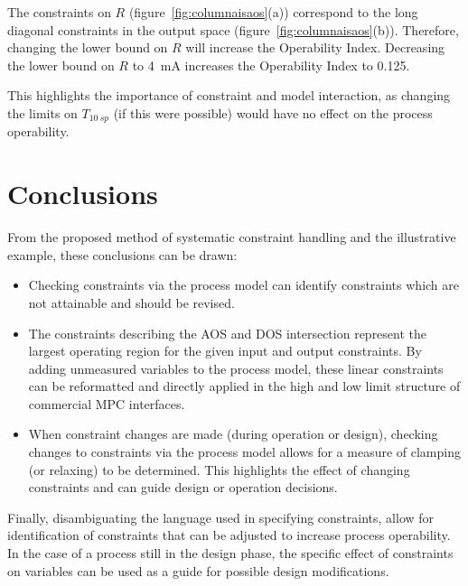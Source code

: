 \documentclass[final,authoryear,5pt,times,twocolumn]{elsarticle}
\begin{document}
The constraints on $R$ (figure~\ref{fig:columnaisaos}(a)) correspond to the long diagonal constraints in the output space (figure~\ref{fig:columnaisaos}(b)).
Therefore, changing the lower bound on $R$ will increase the Operability Index.
Decreasing the lower bound on $R$ to 4~mA increases the Operability Index to 0.125.

This highlights the importance of constraint and model interaction, as changing the limits on $T_{10~sp}$ (if this were possible) would have no effect on the process operability.


\section{Conclusions}\label{sec:conclusions}
From the proposed method of systematic constraint handling and the illustrative example, these conclusions can be drawn:
\begin{itemize}
  \item Checking constraints via the process model can identify constraints which are not attainable and should be revised.
  \item The constraints describing the AOS and DOS intersection represent the largest operating region for the given input and output constraints.
By adding unmeasured variables to the process model, these linear constraints can be reformatted and directly applied in the high and low limit structure of commercial MPC interfaces.
  \item When constraint changes are made (during operation or design), checking changes to constraints via the process model allows for a measure of clamping (or relaxing) to be determined.
This highlights the effect of changing constraints and can guide design or operation decisions.
\end{itemize}

Finally, disambiguating the language used in specifying constraints, allow for identification of constraints that can be adjusted to increase process operability.
In the case of a process still in the design phase, the specific effect of constraints on variables can be used as a guide for possible design modifications. 



\end{document}
